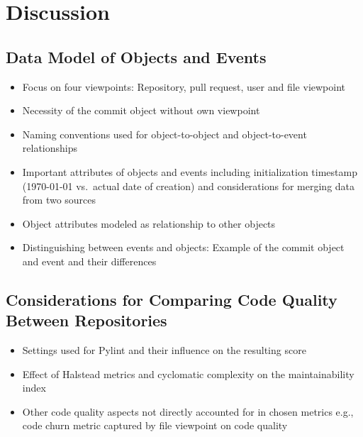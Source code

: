 \chapter{Discussion}
\label{chap:discussion}

\section{Data Model of Objects and Events}
\begin{itemize}
	\item Focus on four viewpoints: Repository, pull request, user and file viewpoint
	\item Necessity of the commit object without own viewpoint
	\item Naming conventions used for object-to-object and object-to-event relationships
	\item Important attributes of objects and events including initialization timestamp (1970-01-01 vs.\ actual date of creation) and considerations for merging data from two sources
	\item Object attributes modeled as relationship to other objects
	\item Distinguishing between events and objects: Example of the commit object and event and their differences
\end{itemize}

\section{Considerations for Comparing Code Quality Between Repositories}
\begin{itemize}
\item Settings used for Pylint and their influence on the resulting score
\item Effect of Halstead metrics and cyclomatic complexity on the maintainability index
\item Other code quality aspects not directly accounted for in chosen metrics e.g., code churn metric captured by file viewpoint on code quality
\end{itemize}
